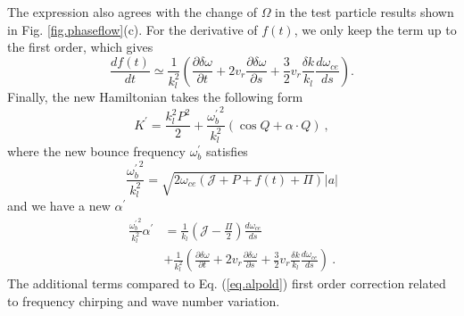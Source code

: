 The expression also agrees with the change of $\Omega$ in the test particle results shown in Fig. \ref{fig.phaseflow}(c).
For the derivative of $f(t)$, we only keep the term up to the first order, which gives
\begin{equation}
    \frac{d f(t)}{d t} \simeq \frac{1}{k_l^2}(\frac{\partial \delta \omega}{\partial t} + 2 v_r \frac{\partial \delta \omega}{\partial s} + \frac{3}{2}v_r\frac{\delta k}{k_l} \frac{d \omega_{ce}}{d s}  ).
\end{equation}
Finally, the new Hamiltonian takes the following form 
\begin{equation}\label{eq.H_frame}
    K^\prime = \frac{k_l^2 P^2}{2} + \frac{{\omega^\prime_{b}}^2}{k_l^2} (\cos Q + \alpha \cdot Q)~,
\end{equation}
where the new bounce frequency $\omega^\prime_{b}$ satisfies
\begin{equation}
    \frac{{\omega^\prime_{b}}^2}{k_l^2} = \sqrt{2\omega_{ce}(\mathcal{J}+P+f(t)+\Pi)}  |a|
\end{equation}
and we have a new $\alpha^\prime$
\begin{equation}\label{eq.alpnew}
    \begin{aligned}
    \frac{{\omega^\prime_{b}}^2}{k_l^2}\alpha^\prime & = \frac{1}{k_l}\left(\mathcal{J} - \frac{\Pi}{2}\right) \frac{d\omega_{ce}}{ds} \\
    & + \frac{1}{k_l^2}\left(\frac{\partial \delta \omega}{\partial t} + 2 v_r \frac{\partial \delta \omega}{\partial s} + \frac{3}{2}v_r\frac{\delta k}{k_l} \frac{d \omega_{ce}}{d s}\right)~.
    \end{aligned}
\end{equation}
The additional terms compared to Eq. (\ref{eq.alpold}) first order correction related to frequency chirping and wave number variation.

